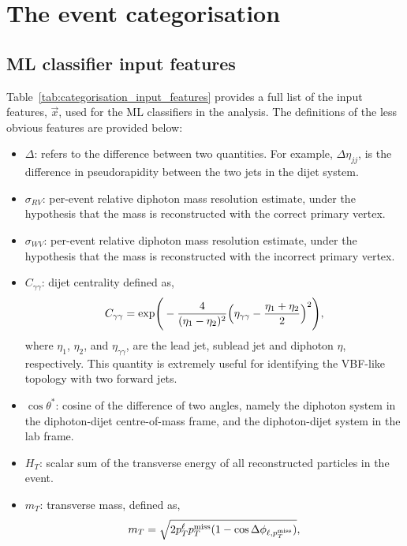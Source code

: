 \chapter{The \Hgg event categorisation}\label{app:event_categorisation}

\section{ML classifier input features}
Table~\ref{tab:categorisation_input_features} provides a full list of the input features, $\vec{x}$, used for the ML classifiers in the \Hgg analysis. The definitions of the less obvious features are provided below:

\begin{itemize}
    \item $\Delta$: refers to the difference between two quantities. For example, $\Delta\eta_{jj}$, is the difference in pseudorapidity between the two jets in the dijet system.
    \item $\sigma_{RV}$: per-event relative diphoton mass resolution estimate, under the hypothesis that the mass is reconstructed with the correct primary vertex. 
    \item $\sigma_{WV}$: per-event relative diphoton mass resolution estimate, under the hypothesis that the mass is reconstructed with the incorrect primary vertex.
    \item $C_{\gamma\gamma}$: dijet centrality defined as,
    \begin{equation}
        C_{\gamma\gamma} = {\rm{exp}} \Bigg( - \frac{4}{(\eta_1-\eta_2)^2} \Big( \eta_{\gamma\gamma} - \frac{\eta_1+\eta_2}{2} \Big)^2 \Bigg),
    \end{equation}
    \noindent
    where $\eta_1$, $\eta_2$, and $\eta_{\gamma\gamma}$, are the lead jet, sublead jet and diphoton $\eta$, respectively. This quantity is extremely useful for identifying the VBF-like topology with two forward jets.
    \item $\cos{\theta^*}$: cosine of the difference of two angles, namely the diphoton system in the diphoton-dijet centre-of-mass frame, and the diphoton-dijet system in the lab frame.
    \item $H_T$: scalar sum of the transverse energy of all reconstructed particles in the event.
    \item $m_T$: transverse mass, defined as,
    \begin{equation}
        m_T = \sqrt{2p_T^\ell\met(1-\cos{\Delta\phi_{\ell,\met}})},

\end{equation}
\end{itemize}
